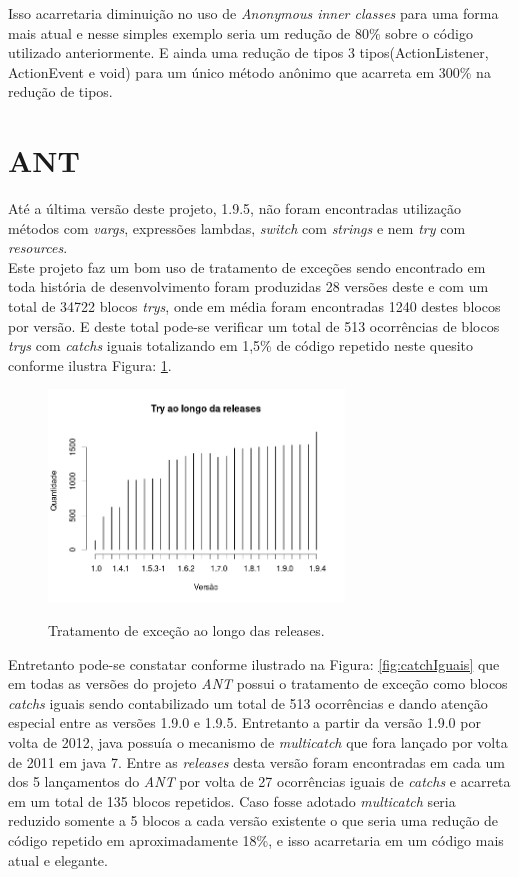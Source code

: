Isso acarretaria diminuição no uso de \textit{Anonymous inner classes} para uma forma mais atual e nesse simples exemplo seria um redução de 80\% sobre o código utilizado anteriormente. E ainda uma redução de tipos 3 tipos(ActionListener, ActionEvent e void) para um único método anônimo que acarreta em 300\% na redução de tipos.




\section{ANT}
Até a última versão deste projeto, 1.9.5, não foram encontradas utilização métodos com \textit{vargs}, expressões lambdas, \textit{switch} com \textit{strings} e nem \textit{try} com \textit{resources}.\\

Este projeto faz um bom uso de tratamento de exceções sendo encontrado em toda história de desenvolvimento foram produzidas 28 versões deste e com um total de 34722 blocos \textit{trys}, onde em média foram encontradas 1240 destes blocos por versão. E deste total pode-se verificar um total de 513 ocorrências de blocos \textit{trys} com \textit{catchs} iguais totalizando em 1,5\% de código repetido neste quesito conforme ilustra Figura: \ref{fig:TrysAnt}.\\

	\begin{figure}[h]
		\center
		\includegraphics[width=0.7\textwidth]{Imagens/trysAnt}
		\label{fig:TrysAnt}
		\caption{Tratamento de exceção ao longo das releases.}
	\end{figure}

Entretanto pode-se constatar conforme ilustrado na Figura: \ref{fig:catchIguais} que em todas as versões do projeto \textit{ANT} possui o tratamento de exceção como blocos \textit{catchs} iguais sendo contabilizado um total de 513 ocorrências e dando atenção especial entre as versões 1.9.0 e 1.9.5. Entretanto a partir da versão 1.9.0 por volta de 2012, java possuía o mecanismo de \textit{multicatch} que fora lançado por volta de 2011 em java 7. Entre as \textit{releases} desta versão foram encontradas em cada um dos 5 lançamentos do \textit{ANT} por volta de 27 ocorrências iguais de \textit{catchs} e acarreta em um total de 135 blocos repetidos. Caso fosse adotado \textit{multicatch} seria reduzido somente a 5 blocos a cada versão existente o que seria uma redução de código repetido em aproximadamente 18\%, e isso acarretaria em um código mais atual e elegante.\\

